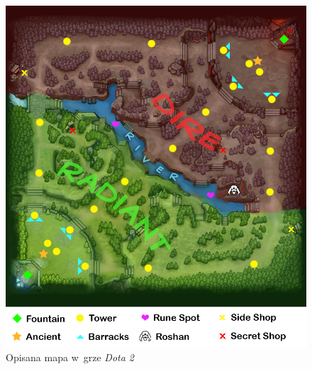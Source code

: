 \documentclass[pl]{minipw} %
\begin{document}
\begin{figure}[H]
\includegraphics[width=\textwidth]{dota2_map.png}
\caption[Opisana mapa w~grze \textit{Dota 2}]{Opisana mapa w~grze \textit{Dota 2} \cite{dota2_map_src}} 
\label{dota2_map}
\end{figure}
\end{document}

